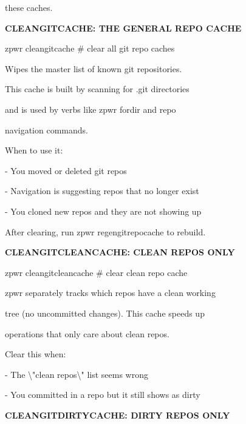 \documentclass[11pt,a4paper,twoside]{book}
\begin{document}
these caches.


\vspace{12pt}
{\bfseries\color{neonyellow} CLEANGITCACHE: THE GENERAL REPO CACHE}\vspace{4pt}

\begin{codebox}
zpwr cleangitcache                  \# clear all git repo caches\\
\end{codebox}

Wipes the master list of known git repositories.

This cache is built by scanning for .git directories

\begin{codebox}
and is used by verbs like zpwr fordir and repo\\
\end{codebox}

navigation commands.

When to use it:

- You moved or deleted git repos

- Navigation is suggesting repos that no longer exist

- You cloned new repos and they are not showing up

\begin{codebox}
After clearing, run zpwr regengitrepocache to rebuild.\\
\end{codebox}


\vspace{12pt}
{\bfseries\color{neonyellow} CLEANGITCLEANCACHE: CLEAN REPOS ONLY}\vspace{4pt}

\begin{codebox}
zpwr cleangitcleancache             \# clear clean repo cache\\
\end{codebox}

zpwr separately tracks which repos have a clean working

tree (no uncommitted changes). This cache speeds up

operations that only care about clean repos.

Clear this when:

- The \textbackslash{}"clean repos\textbackslash{}" list seems wrong

- You committed in a repo but it still shows as dirty


\vspace{12pt}
{\bfseries\color{neonyellow} CLEANGITDIRTYCACHE: DIRTY REPOS ONLY}\vspace{4pt}
\end{document}
